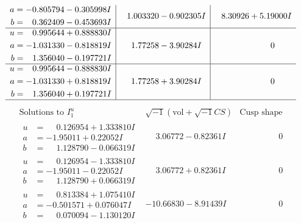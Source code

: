 \documentclass[1p]{elsarticle_modified}
\theoremstyle{definition}
\newcommand{\I}{\sqrt{-1}}
\begin{document}
$$\begin{array}{c|c|c}
\begin{aligned}
a &= -0.805794 - 0.305998 I \\
b &= \phantom{-}0.362409 - 0.453693 I\end{aligned}
 & \phantom{-}1.003320 - 0.902305 I & \phantom{-}8.30926 + 5.19000 I \\ \hline\begin{aligned}
u &= \phantom{-}0.995644 + 0.888830 I \\
a &= -1.031330 - 0.818819 I \\
b &= \phantom{-}1.356040 - 0.197721 I\end{aligned}
 & \phantom{-}1.77258 - 3.90284 I & \phantom{-0.000000 } 0 \\ \hline\begin{aligned}
u &= \phantom{-}0.995644 - 0.888830 I \\
a &= -1.031330 + 0.818819 I \\
b &= \phantom{-}1.356040 + 0.197721 I\end{aligned}
 & \phantom{-}1.77258 + 3.90284 I & \phantom{-0.000000 } 0\\
 \hline 
 \end{array}$$\newpage$$\begin{array}{c|c|c}  
\text{Solutions to }I^u_{1}& \I (\text{vol} + \sqrt{-1}CS) & \text{Cusp shape}\\
 \hline 
\begin{aligned}
u &= \phantom{-}0.126954 + 1.333810 I \\
a &= -1.95011 + 0.22052 I \\
b &= \phantom{-}1.128790 - 0.066319 I\end{aligned}
 & \phantom{-}3.06772 - 0.82361 I & \phantom{-0.000000 } 0 \\ \hline\begin{aligned}
u &= \phantom{-}0.126954 - 1.333810 I \\
a &= -1.95011 - 0.22052 I \\
b &= \phantom{-}1.128790 + 0.066319 I\end{aligned}
 & \phantom{-}3.06772 + 0.82361 I & \phantom{-0.000000 } 0 \\ \hline\begin{aligned}
u &= \phantom{-}0.813384 + 1.075410 I \\
a &= -0.501571 + 0.076047 I \\
b &= \phantom{-}0.070094 - 1.130120 I\end{aligned}
 & -10.66830 - 8.91439 I & \phantom{-0.000000 } 0 \\ \hline\begin{aligned}

\end{aligned}
\end{array}$$
\end{document}
